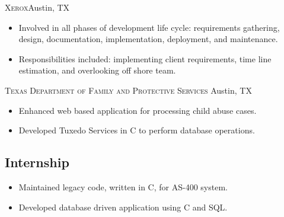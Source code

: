 \documentclass[11pt,letterpaper,sans]{moderncv}
\begin{document}
     {\textsc{Xerox}}{Austin, TX}{}
     {\begin{itemize}
         \item Involved in all phases of development life cycle:
               requirements gathering, design, documentation,
               implementation, deployment, and maintenance.
         \item Responsibilities included: implementing client requirements,
               time line estimation, and overlooking off shore team.
     \end{itemize}}

     {\textsc{Texas Department of Family and Protective Services}}
             {Austin, TX}{}
     {\begin{itemize}
         \item Enhanced web based application for processing child
               abuse cases.
         \item Developed Tuxedo Services in C to perform database
               operations.
     \end{itemize}}

  \subsection{Internship}
     {\begin{itemize}
         \item Maintained legacy code, written in C, for AS-400
               system.
         \item Developed database driven application using C and SQL.
     \end{itemize}}


\end{document}
